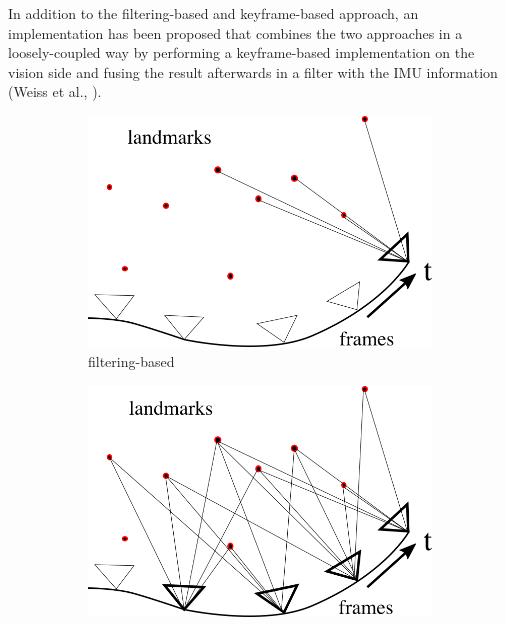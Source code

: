 In addition to the filtering-based and keyframe-based approach, an implementation has been proposed that combines the two approaches in a loosely-coupled way by performing a keyframe-based implementation on the vision side and fusing the result afterwards in a filter with the IMU information (Weiss et al., \cite{weiss2012real}). \\

\begin{figure}
  \begin{subfigure}[b]{0.4\textwidth}
    \captionsetup{skip=6pt}
    \includegraphics[width=\textwidth]{images/filteringbased_2.png}
    \caption{filtering-based}
    \label{fig:1}
  \end{subfigure}
  \hfill
  \begin{subfigure}[b]{0.4\textwidth}
    \captionsetup{skip=6pt}
    \includegraphics[width=\textwidth]{images/keyframebased_2.png}

\end{subfigure}
\end{figure}
